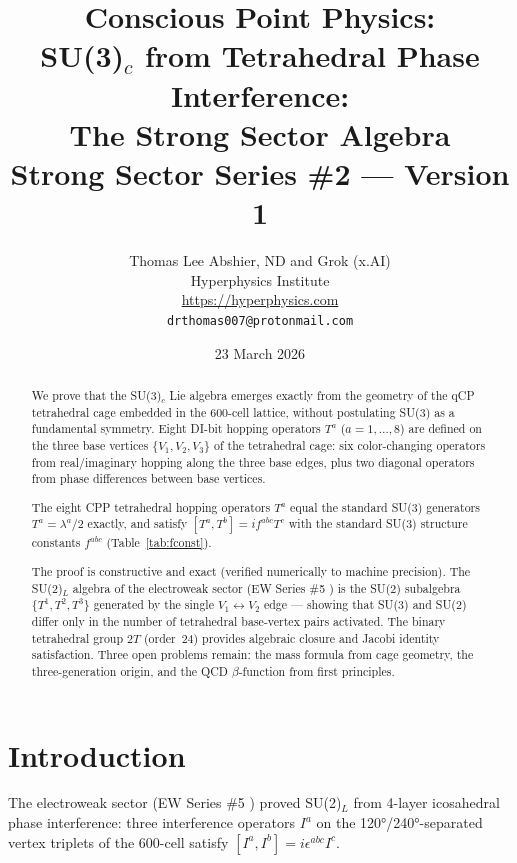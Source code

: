 \documentclass[11pt,a4paper]{article}
\title{\textbf{Conscious Point Physics:\\
SU(3)$_c$ from Tetrahedral Phase Interference:\\
The Strong Sector Algebra}\\[6pt]
{\large Strong Sector Series \#2 --- Version 1}}
\author{Thomas Lee Abshier, ND and Grok (x.AI)\\
Hyperphysics Institute\\
\url{https://hyperphysics.com}\\
\texttt{drthomas007@protonmail.com}}
\date{23 March 2026}
\begin{document}
\maketitle

\begin{abstract}
We prove that the SU(3)$_c$ Lie algebra emerges exactly from the
geometry of the qCP tetrahedral cage embedded in the 600-cell lattice,
without postulating SU(3) as a fundamental symmetry.  Eight DI-bit
hopping operators $T^a$ ($a = 1,\ldots,8$) are defined on the three
base vertices $\{V_1, V_2, V_3\}$ of the tetrahedral cage:
six color-changing operators from real/imaginary hopping along the
three base edges, plus two diagonal operators from phase differences
between base vertices.

\begin{theorem*}[Main]
The eight CPP tetrahedral hopping operators $T^a$ equal the
standard SU(3) generators $T^a = \lambda^a/2$ exactly, and
satisfy $[T^a, T^b] = if^{abc}T^c$ with the standard SU(3)
structure constants $f^{abc}$ (Table~\ref{tab:fconst}).
\end{theorem*}

The proof is constructive and exact (verified numerically to machine
precision).  The SU(2)$_L$ algebra of the electroweak sector
(EW Series \#5 \citep{cpp_ew5}) is the SU(2) subalgebra
$\{T^1, T^2, T^3\}$ generated by the single $V_1 \leftrightarrow V_2$
edge --- showing that SU(3) and SU(2) differ only in the number of
tetrahedral base-vertex pairs activated.  The binary tetrahedral group
$2T$ (order~24) provides algebraic closure and Jacobi identity
satisfaction.  Three open problems remain: the mass formula from cage
geometry, the three-generation origin, and the QCD $\beta$-function
from first principles.
\end{abstract}

\tableofcontents
\newpage

\section{Introduction}

The electroweak sector (EW Series \#5 \citep{cpp_ew5}) proved
SU(2)$_L$ from 4-layer icosahedral phase interference: three
interference operators $I^a$ on the 120°/240°-separated vertex
triplets of the 600-cell satisfy $[I^a, I^b] = i\epsilon^{abc}I^c$.
\end{document}
